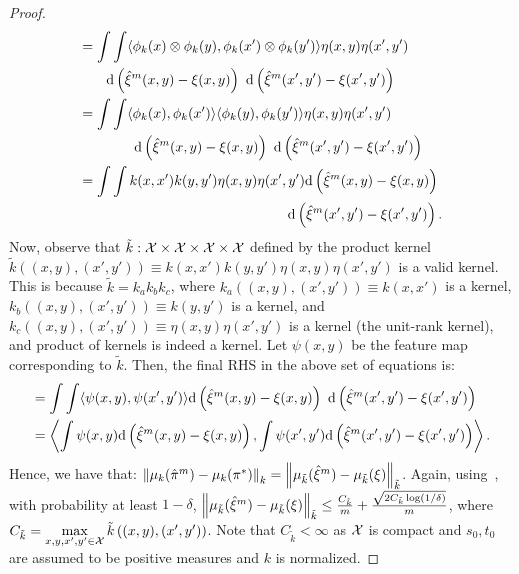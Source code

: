 \begin{proof}
\begin{align*}
    &=\int\int\langle\phi_k(x)\otimes\phi_k(y),\phi_k(x')\otimes\phi_k(y')\rangle\eta(x,y)\eta(x',y')\\
    &\qquad\textup{d}\left(\hatxi^m(x,y)-\xi(x,y)\right)\ \textup{d}\left(\hatxi^m(x',y')-\xi(x',y')\right)\\
    &=\int\int\langle\phi_k(x),\phi_k(x')\rangle\langle\phi_k(y),\phi_k(y')\rangle\eta(x,y)\eta(x',y')\\
    &\qquad\qquad\textup{d}\left(\hatxi^m(x,y)-\xi(x,y)\right)\ \textup{d}\left(\hatxi^m(x',y')-\xi(x',y')\right)\\
    &=\int\int k(x,x')k(y,y')\eta(x,y)\eta(x',y')\textup{d}\left(\hatxi^m(x,y)-\xi(x,y)\right)\ \\
    &\qquad\qquad\qquad\qquad\qquad\qquad\qquad\quad\textup{d}\left(\hatxi^m(x',y')-\xi(x',y')\right).
\end{align*}
Now, observe that $\tilde{k}:\mathcal{X}\times\mathcal{X}\times\mathcal{X}\times\mathcal{X}$ defined by the product kernel $\tilde{k}\left((x,y),(x',y')\right)\equiv k(x,x')k(y,y')\eta(x,y)\eta(x',y')$ is a valid kernel. This is because $\tilde{k}=k_ak_bk_c$, where $k_a\left((x,y),(x',y')\right)\equiv k(x, x')$ is a kernel, $k_b\left((x,y),(x',y')\right)\equiv k(y, y')$ is a kernel, and $k_c\left((x,y),(x',y')\right)\equiv\eta(x,y)\eta(x',y')$ is a kernel (the unit-rank kernel), and product of kernels is indeed a kernel. Let $\psi(x,y)$ be the feature map corresponding to $\tilde{k}$. Then, the final RHS in the above set of equations is:
\begin{align*}
&=\int\int \langle\psi(x,y),\psi(x',y')\rangle\textup{d}\left(\hatxi^m(x,y)-\xi(x,y)\right)\ \textup{d}\left(\hatxi^m(x',y')-\xi(x',y')\right)\\
&=\left\langle\int\psi(x,y)\textup{d}\left(\hatxi^m(x,y)-\xi(x,y)\right),\int\psi(x',y')\textup{d}\left(\hatxi^m(x',y')-\xi(x',y')\right)\right\rangle. 
\end{align*}
Hence, we have that: $\left\|\mu_k(\hat{\pi}^m)-\mu_k(\pi^*)\right\|_k=\left\|\mu_{\tilde{k}}(\hat{\xi}^m)-\mu_{\tilde{k}}(\xi)\right\|_{\tilde{k}}$. Again, using~\citet[Theorem~3.4]{Muandet_2017}, with probability at least $1-\delta$, $\left\|\mu_{\tilde{k}}(\hat{\xi}^m)-\mu_{\tilde{k}}(\xi)\right\|_{\tilde{k}}\le\frac{C_{\tilde{k}}}{{m}}+\frac{\sqrt{2C_{\tilde{k}}\log({1/\delta})}}{m}$, where $C_{\tilde{k}}=\max\limits_{x,y,x',y'\in\mathcal{X}}\tilde{k}\left((x,y),(x',y')\right)$. Note that $C_{\tilde{k}}<\infty$ as $\mathcal{X}$ is compact and $s_0,t_0$ are assumed to be positive measures and $k$ is normalized.


\end{proof}
